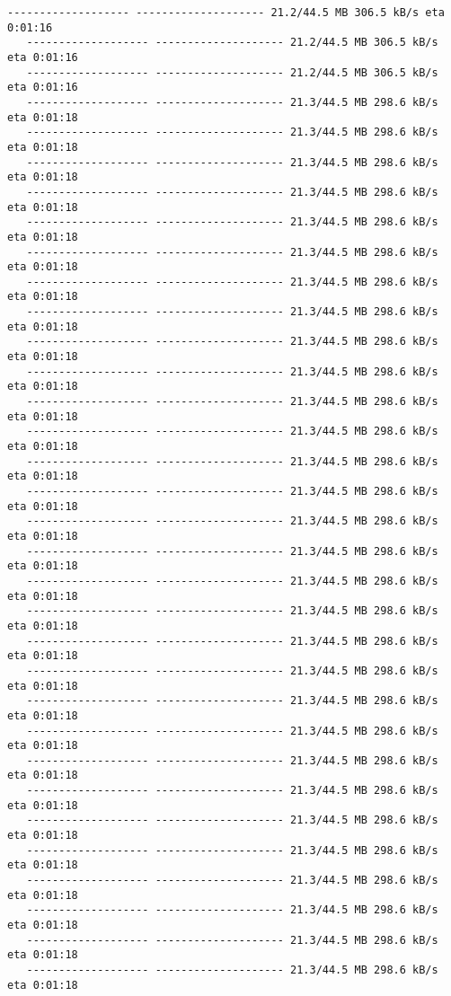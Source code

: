 \documentclass[11pt]{article}
\begin{document}
\begin{Verbatim}[commandchars=\\\{\}]
   ------------------- -------------------- 21.2/44.5 MB 306.5 kB/s eta 0:01:16
   ------------------- -------------------- 21.2/44.5 MB 306.5 kB/s eta 0:01:16
   ------------------- -------------------- 21.2/44.5 MB 306.5 kB/s eta 0:01:16
   ------------------- -------------------- 21.3/44.5 MB 298.6 kB/s eta 0:01:18
   ------------------- -------------------- 21.3/44.5 MB 298.6 kB/s eta 0:01:18
   ------------------- -------------------- 21.3/44.5 MB 298.6 kB/s eta 0:01:18
   ------------------- -------------------- 21.3/44.5 MB 298.6 kB/s eta 0:01:18
   ------------------- -------------------- 21.3/44.5 MB 298.6 kB/s eta 0:01:18
   ------------------- -------------------- 21.3/44.5 MB 298.6 kB/s eta 0:01:18
   ------------------- -------------------- 21.3/44.5 MB 298.6 kB/s eta 0:01:18
   ------------------- -------------------- 21.3/44.5 MB 298.6 kB/s eta 0:01:18
   ------------------- -------------------- 21.3/44.5 MB 298.6 kB/s eta 0:01:18
   ------------------- -------------------- 21.3/44.5 MB 298.6 kB/s eta 0:01:18
   ------------------- -------------------- 21.3/44.5 MB 298.6 kB/s eta 0:01:18
   ------------------- -------------------- 21.3/44.5 MB 298.6 kB/s eta 0:01:18
   ------------------- -------------------- 21.3/44.5 MB 298.6 kB/s eta 0:01:18
   ------------------- -------------------- 21.3/44.5 MB 298.6 kB/s eta 0:01:18
   ------------------- -------------------- 21.3/44.5 MB 298.6 kB/s eta 0:01:18
   ------------------- -------------------- 21.3/44.5 MB 298.6 kB/s eta 0:01:18
   ------------------- -------------------- 21.3/44.5 MB 298.6 kB/s eta 0:01:18
   ------------------- -------------------- 21.3/44.5 MB 298.6 kB/s eta 0:01:18
   ------------------- -------------------- 21.3/44.5 MB 298.6 kB/s eta 0:01:18
   ------------------- -------------------- 21.3/44.5 MB 298.6 kB/s eta 0:01:18
   ------------------- -------------------- 21.3/44.5 MB 298.6 kB/s eta 0:01:18
   ------------------- -------------------- 21.3/44.5 MB 298.6 kB/s eta 0:01:18
   ------------------- -------------------- 21.3/44.5 MB 298.6 kB/s eta 0:01:18
   ------------------- -------------------- 21.3/44.5 MB 298.6 kB/s eta 0:01:18
   ------------------- -------------------- 21.3/44.5 MB 298.6 kB/s eta 0:01:18
   ------------------- -------------------- 21.3/44.5 MB 298.6 kB/s eta 0:01:18
   ------------------- -------------------- 21.3/44.5 MB 298.6 kB/s eta 0:01:18
   ------------------- -------------------- 21.3/44.5 MB 298.6 kB/s eta 0:01:18
   ------------------- -------------------- 21.3/44.5 MB 298.6 kB/s eta 0:01:18
   ------------------- -------------------- 21.3/44.5 MB 298.6 kB/s eta 0:01:18

\end{Verbatim}
\end{document}
